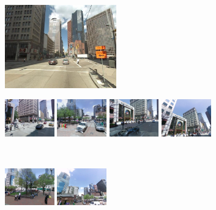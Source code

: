 \\
\begin{minipage}{0.34\linewidth}
    \centering
    \vspace{0mm}
    \includegraphics[height=36mm]{imgs/ex2/query.jpg}
\end{minipage}
\begin{minipage}{0.75\linewidth}
    \begin{minipage}{\linewidth} 
        \colorbox{myGreen}{\includegraphics[height=16mm]{imgs/ex2/FVsvm1.jpg}}
        \colorbox{myGreen}{\includegraphics[height=16mm]{imgs/ex2/FVsvm2.jpg}}
        \colorbox{myGreen}{\includegraphics[height=16mm]{imgs/ex2/FVsvm3.jpg}}
        \colorbox{myGreen}{\includegraphics[height=16mm]{imgs/ex2/FVsvm4.jpg}}
    \end{minipage}
    \\
    \begin{minipage}{\linewidth}
        \colorbox{myRed}{\includegraphics[height=16mm]{imgs/ex2/FV1.jpg}}
        \colorbox{myRed}{\includegraphics[height=16mm]{imgs/ex2/FV2.jpg}}

\end{minipage}
\end{minipage}
